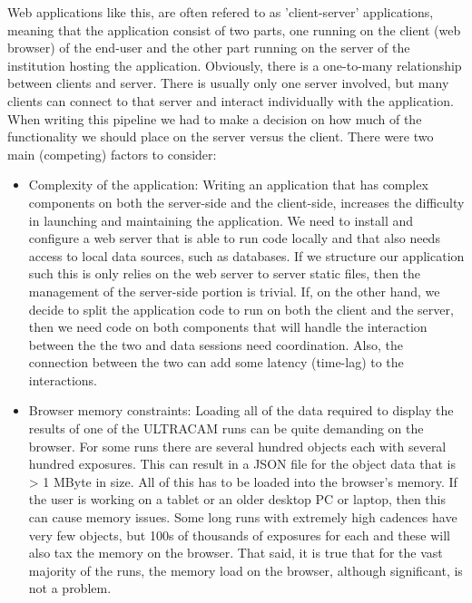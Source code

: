 Web applications like this, are often refered to as 'client-server' applications, meaning that the application consist of two parts, one running on the client (web browser) of the end-user and the other part running on the server of the institution hosting the application. Obviously, there is a one-to-many relationship between clients and server. There is usually only one server involved, but many clients can connect to that server and interact individually with the application. When writing this pipeline we had to make a decision on how much of the functionality we should place on the server versus the client. There were two main (competing) factors to consider:

\begin{itemize}
  \item Complexity of the application: Writing an application that has complex components on both the server-side and the client-side, increases the difficulty in launching and maintaining the application. We need to install and configure a web server that is able to run code locally and that also needs access to local data sources, such as databases. If we structure our application such this is only relies on the web server to server static files, then the management of the server-side portion is trivial. If, on the other hand, we decide to split the application code to run on both the client and the server, then we need code on both components that will handle the interaction between the the two and data sessions need coordination. Also, the connection between the two can add some latency (time-lag) to the interactions. 

  \item Browser memory constraints: Loading all of the data required to display the results of one of the ULTRACAM runs can be quite demanding on the browser. For some runs there are several hundred objects each with several hundred exposures. This can result in a JSON file for the object data that is > 1 MByte in size. All of this has to be loaded into the browser's memory. If the user is working on a tablet or an older desktop PC or laptop, then this can cause memory issues. Some long runs with extremely high cadences have very few objects, but 100s of thousands of exposures for each and these will also tax the memory on the browser. That said, it is true that for the vast majority of the runs, the memory load on the browser, although significant, is not a problem.   
\end{itemize}

